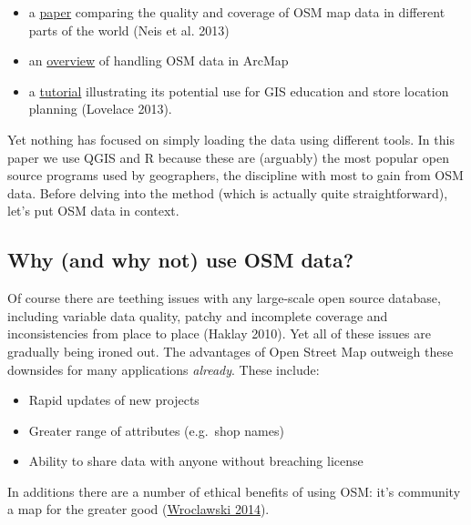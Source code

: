 \documentclass[]{article}
\begin{document}
\begin{itemize}
\itemsep1pt\parskip0pt
\item
  a \href{http://www.mdpi.com/1999-5903/5/2/282/pdf}{paper} comparing
  the quality and coverage of OSM map data in different parts of the
  world (Neis et al. 2013)
\item
  an
  \href{http://www.library.carleton.ca/sites/default/files/help/gis/WorkingWithOpenStreetMap.pdf}{overview}
  of handling OSM data in ArcMap
\item
  a
  \href{http://elogeo.nottingham.ac.uk/xmlui/bitstream/handle/url/289/osm-tutorial-final-2.pdf?sequence=1}{tutorial}
  illustrating its potential use for GIS education and store location
  planning (Lovelace 2013).
\end{itemize}

Yet nothing has focused on simply loading the data using different
tools. In this paper we use QGIS and R because these are (arguably) the
most popular open source programs used by geographers, the discipline
with most to gain from OSM data. Before delving into the method (which
is actually quite straightforward), let's put OSM data in context.

\subsection{Why (and why not) use OSM
data?}\label{why-and-why-not-use-osm-data}

Of course there are teething issues with any large-scale open source
database, including variable data quality, patchy and incomplete
coverage and inconsistencies from place to place (Haklay 2010). Yet all
of these issues are gradually being ironed out. The advantages of Open
Street Map outweigh these downsides for many applications
\emph{already}. These include:

\begin{itemize}
\itemsep1pt\parskip0pt
\item
  Rapid updates of new projects
\item
  Greater range of attributes (e.g.~shop names)
\item
  Ability to share data with anyone without breaching license
\end{itemize}

In additions there are a number of ethical benefits of using OSM: it's
community a map for the greater good
(\href{http://www.theguardian.com/technology/2014/jan/14/why-the-world-needs-openstreetmap}{Wroclawski
2014}).
\end{document}

